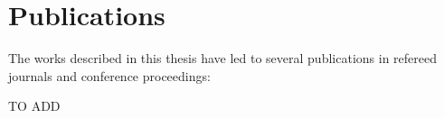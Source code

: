 \chapter*{Publications}

The works described in this thesis have led to several publications in refereed journals and conference proceedings:

TO ADD
